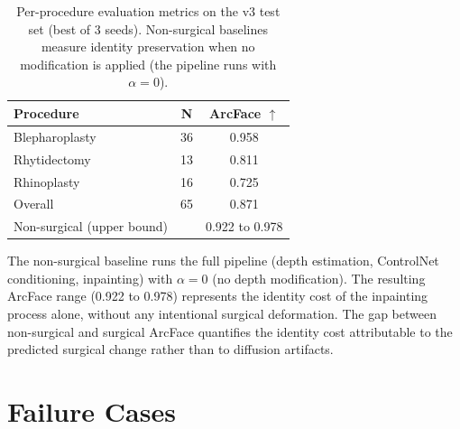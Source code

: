 \documentclass[10pt,twocolumn,letterpaper]{article}
\begin{document}
\begin{table}[H]
\centering
\caption{Per-procedure evaluation metrics on the v3 test set (best of 3
seeds). Non-surgical baselines measure identity preservation when no
modification is applied (the pipeline runs with $\alpha = 0$).}
\label{tab:per_procedure_v3}
\begin{tabular}{@{}lcc@{}}
\toprule
\textbf{Procedure} & \textbf{N} & \textbf{ArcFace} $\uparrow$ \\
\midrule
Blepharoplasty  & 36 & 0.958 \\
Rhytidectomy    & 13 & 0.811 \\
Rhinoplasty     & 16 & 0.725 \\
\midrule
Overall         & 65 & 0.871 \\
\midrule
Non-surgical (upper bound) &    & 0.922 to 0.978 \\
\bottomrule
\end{tabular}
\end{table}

The non-surgical baseline runs the full pipeline (depth estimation,
ControlNet conditioning, inpainting) with $\alpha = 0$ (no depth
modification). The resulting ArcFace range (0.922 to 0.978) represents
the identity cost of the inpainting process alone, without any
intentional surgical deformation. The gap between non-surgical and
surgical ArcFace quantifies the identity cost attributable to the
predicted surgical change rather than to diffusion artifacts.

\section{Failure Cases}
\end{document}
